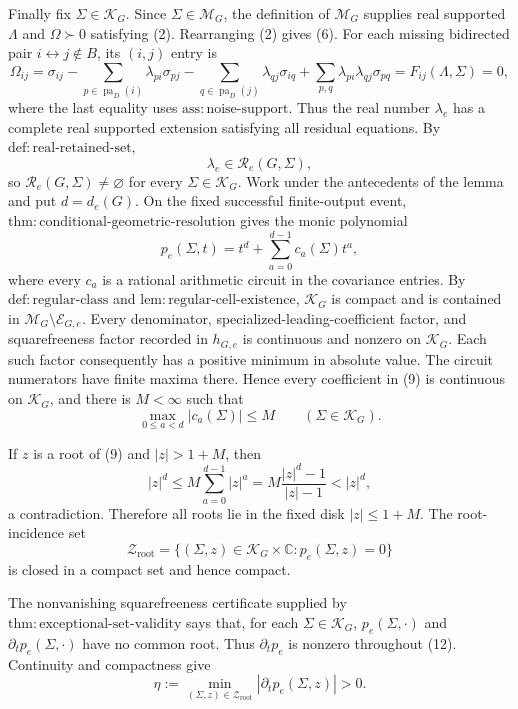 Finally fix \(\Sigma\in\mathcal K_G\).  Since \(\Sigma\in\mathcal M_G\), the definition of \(\mathcal M_G\) supplies real supported \(\Lambda\) and \(\Omega\succ0\) satisfying (2).  Rearranging (2) gives (6).  For each missing bidirected pair \(i\leftrightarrow j\notin B\), its \((i,j)\) entry is
\[
 \Omega_{ij}
 =\sigma_{ij}
 -\sum_{p\in\operatorname{pa}_D(i)}\lambda_{pi}\sigma_{pj}
 -\sum_{q\in\operatorname{pa}_D(j)}\lambda_{qj}\sigma_{iq}
 +\sum_{p,q}\lambda_{pi}\lambda_{qj}\sigma_{pq}
 =F_{ij}(\Lambda,\Sigma)=0,
\tag{8}
\]
where the last equality uses \(\mathrm{ass:noise\mbox{-}support}\).  Thus the real number \(\lambda_e\) has a complete real supported extension satisfying all residual equations.  By \(\mathrm{def:real\mbox{-}retained\mbox{-}set}\),
\[
 \lambda_e\in\mathcal R_e(G,\Sigma),
\]
so \(\mathcal R_e(G,\Sigma)\ne\varnothing\) for every \(\Sigma\in\mathcal K_G\).
Work under the antecedents of the lemma and put \(d=d_e(G)\).  On the fixed successful finite-output event, \(\mathrm{thm:conditional\mbox{-}geometric\mbox{-}resolution}\) gives the monic polynomial
\[
 p_e(\Sigma,t)=t^d+\sum_{a=0}^{d-1}c_a(\Sigma)t^a,
\tag{9}
\]
where every \(c_a\) is a rational arithmetic circuit in the covariance entries.  By \(\mathrm{def:regular\mbox{-}class}\) and \(\mathrm{lem:regular\mbox{-}cell\mbox{-}existence}\), \(\mathcal K_G\) is compact and is contained in \(\mathcal M_G\setminus\mathcal E_{G,e}\).  Every denominator, specialized-leading-coefficient factor, and squarefreeness factor recorded in \(h_{G,e}\) is continuous and nonzero on \(\mathcal K_G\).  Each such factor consequently has a positive minimum in absolute value.  The circuit numerators have finite maxima there.  Hence every coefficient in (9) is continuous on \(\mathcal K_G\), and there is \(M<\infty\) such that
\[
 \max_{0\leq a<d}|c_a(\Sigma)|\leq M
 \qquad(\Sigma\in\mathcal K_G).
\tag{10}
\]

If \(z\) is a root of (9) and \(|z|>1+M\), then
\[
 |z|^d
 \leq M\sum_{a=0}^{d-1}|z|^a
 =M\frac{|z|^d-1}{|z|-1}
 <|z|^d,
\tag{11}
\]
a contradiction.  Therefore all roots lie in the fixed disk \(|z|\leq1+M\).  The root-incidence set
\[
 \mathcal Z_{\mathrm{root}}
 =\{(\Sigma,z)\in\mathcal K_G\times\mathbb C:p_e(\Sigma,z)=0\}
\tag{12}
\]
is closed in a compact set and hence compact.

The nonvanishing squarefreeness certificate supplied by \(\mathrm{thm:exceptional\mbox{-}set\mbox{-}validity}\) says that, for each \(\Sigma\in\mathcal K_G\), \(p_e(\Sigma,\cdot)\) and \(\partial_t p_e(\Sigma,\cdot)\) have no common root.  Thus \(\partial_t p_e\) is nonzero throughout (12).  Continuity and compactness give
\[
 \eta
 :=\min_{(\Sigma,z)\in\mathcal Z_{\mathrm{root}}}
 |\partial_t p_e(\Sigma,z)|>0.
\tag{13}
\]


